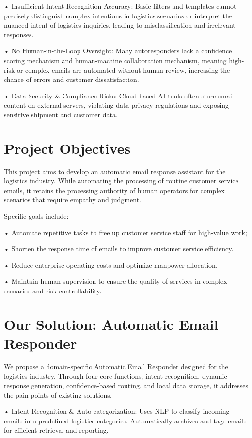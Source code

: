 \documentclass[12pt]{article}
\begin{document}
• Insufficient Intent Recognition Accuracy: Basic filters and templates cannot precisely distinguish complex intentions in logistics scenarios or interpret the nuanced intent of logistics inquiries, leading to misclassification and irrelevant responses.

• No Human-in-the-Loop Oversight: Many autoresponders lack a confidence scoring mechanism and human-machine collaboration mechanism, meaning high-risk or complex emails are automated without human review, increasing the chance of errors and customer dissatisfaction.

• Data Security \& Compliance Risks: Cloud-based AI tools often store email content on external servers, violating data privacy regulations and exposing sensitive shipment and customer data.

\section{Project Objectives}

This project aims to develop an automatic email response assistant for the logistics industry. While automating the processing of routine customer service emails, it retains the processing authority of human operators for complex scenarios that require empathy and judgment.

Specific goals include:

• Automate repetitive tasks to free up customer service staff for high-value work;

• Shorten the response time of emails to improve customer service efficiency.

• Reduce enterprise operating costs and optimize manpower allocation.

• Maintain human supervision to ensure the quality of services in complex scenarios and risk controllability.

\section{Our Solution: Automatic Email Responder}

We propose a domain-specific Automatic Email Responder designed for the logistics industry. Through four core functions, intent recognition, dynamic response generation, confidence-based routing, and local data storage, it addresses the pain points of existing solutions.

• Intent Recognition \& Auto-categorization: Uses NLP to classify incoming emails into predefined logistics categories. Automatically archives and tags emails for efficient retrieval and reporting.
\end{document}
